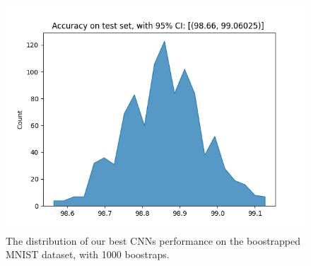 \begin{figure}[H]
    \centering
    \includegraphics[width=\linewidth]{results/evaluation/cnn_confidence.png}
    \caption{The distribution of our best CNNs performance on the boostrapped MNIST dataset, with 1000 boostraps.}
    \label{fig:cnn_conf}
\end{figure}

\newpage
